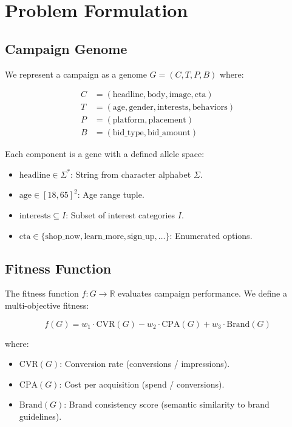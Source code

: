 \section{Problem Formulation}


\subsection{Campaign Genome}

We represent a campaign as a genome $G = (C, T, P, B)$ where:

\begin{align}
C &= (\text{headline}, \text{body}, \text{image}, \text{cta}) \\
T &= (\text{age}, \text{gender}, \text{interests}, \text{behaviors}) \\
P &= (\text{platform}, \text{placement}) \\
B &= (\text{bid\_type}, \text{bid\_amount})
\end{align}

Each component is a gene with a defined allele space:

\begin{itemize}
\item $\text{headline} \in \Sigma^*$: String from character alphabet $\Sigma$.
\item $\text{age} \in [18, 65]^2$: Age range tuple.
\item $\text{interests} \subseteq I$: Subset of interest categories $I$.
\item $\text{cta} \in \{\text{shop\_now}, \text{learn\_more}, \text{sign\_up}, \ldots\}$: Enumerated options.
\end{itemize}

\subsection{Fitness Function}

The fitness function $f: G \rightarrow \mathbb{R}$ evaluates campaign performance. We define a multi-objective fitness:

\begin{equation}
f(G) = w_1 \cdot \text{CVR}(G) - w_2 \cdot \text{CPA}(G) + w_3 \cdot \text{Brand}(G)
\end{equation}

where:
\begin{itemize}
\item $\text{CVR}(G)$: Conversion rate (conversions / impressions).
\item $\text{CPA}(G)$: Cost per acquisition (spend / conversions).
\item $\text{Brand}(G)$: Brand consistency score (semantic similarity to brand guidelines).
\end{itemize}

